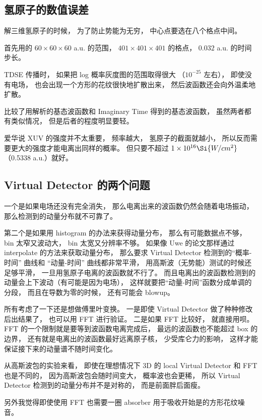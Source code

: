 
\subsection{氢原子的数值误差}
解三维氢原子的时候， 为了防止势能为无穷， 中心点要选在八个格点中间。

首先用的 $60\times 60\times 60$ a.u. 的范围， $401\times 401\times 401$ 的格点， $0.032$ a.u. 的时间步长。

TDSE 传播时， 如果把 log 概率灰度图的范围取得很大 （$10^{-25}$ 左右）， 即使没有电场， 也会出现一个方形的花纹很快地扩散出来， 然后波函数还会向外温柔地扩散。

比较了用解析的基态波函数和 Imaginary Time 得到的基态波函数， 虽然两者都有类似情况， 但是后者的程度明显要轻。

爱华说 XUV 的强度并不太重要， 频率越大， 氢原子的截面就越小， 所以反而需要更大的强度才能电离出同样的概率。 但只要不超过 $1\times 10^{16} \Si{W/cm^2}$ （0.5338 a.u.）就好。

\subsection{Virtual Detector 的两个问题}
一个是如果电场还没有完全消失， 那么电离出来的波函数仍然会随着电场振动， 那么检测到的动量分布就不可靠了。

第二个是如果用 histogram 的办法来获得动量分布， 那么有可能数据点不够， bin 太窄又波动大， bin 太宽又分辨率不够。 如果像 Uwe 的论文那样通过 interpolate 的方法来获取动量分布， 那么要求 Virtual Detector 检测到的“概率-时间” 曲线和 “动量-时间” 曲线都非常平滑， 用高斯波（无势能）测试的时候还足够平滑， 一旦用氢原子电离的波函数就不行了。 而且电离出的波函数检测到的动量会上下波动（有可能是因为电场）， 这样就要把“动量-时间”函数分成单调的分段， 而且在导数为零的时候， 还有可能会 blowup。

所有考虑了一下还是想做傅里叶变换。 一是即使 Virtual Detector 做了种种修改后出结果了， 也可以用 FFT 进行验证。 二是如果 FFT 比较好， 就直接用呗。 FFT 的一个限制就是要等到波函数电离完成后， 最远的波函数也不能超过 box 的边界， 还有就是电离出的波函数最好远离原子核， 少受库仑力的影响， 这样才能保证接下来的动量谱不随时间变化。

从高斯波包的实验来看， 即使在理想情况下 3D 的 local Virtual Detector 和 FFT 也是不同的， 因为高斯波包会随时间变大， 概率波也会更稀， 所以 Virtual Detector 检测到的动量分布并不是对称的， 而是前面胖后面瘦。

另外我觉得即使使用 FFT 也需要一圈 absorber 用于吸收开始是的方形花纹噪音。

